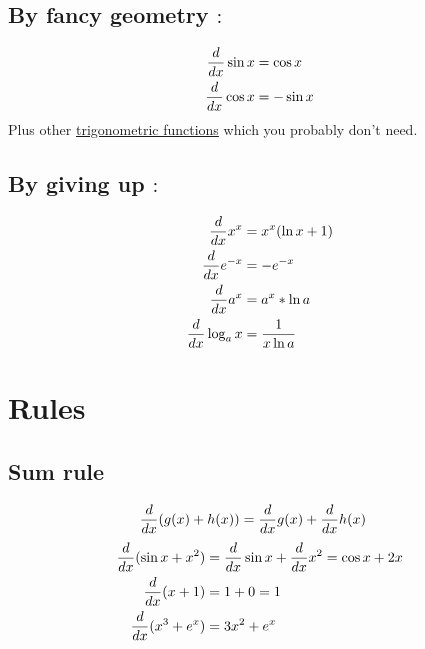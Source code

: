 \documentclass[a4paper,14pt,twoside]{book}
\begin{document}
{\subsection{By fancy geometry $:$}
\begin{align*}
	\frac{d}{dx} \sin{x} & = \cos{x}  \\
	\frac{d}{dx} \cos{x} & = -\sin{x}
\end{align*}
Plus other \href{https://www.priklady.eu/cs/matematika/derivace/derivace-funkce.alej}{trigonometric functions} which you probably don't need.
\subsection{By giving up $:$}
\begin{align*}
	\frac{d}{dx} x^x       & = x^x(\ln{x} + 1) \\
	\frac{d}{dx} e^{-x}    & = -e^{-x}         \\
	\frac{d}{dx} a^x       & = a^x*\ln{a}      \\
	\frac{d}{dx} \log_a{x} & = \frac{1}{x\ln{a}}
\end{align*}
\pagebreak
\section{Rules}
\subsection{Sum rule}
\begin{align*}
	\frac{d}{dx} (g(x) + h(x)) & = \frac{d}{dx} g(x) + \frac{d}{dx} h(x)
\end{align*}
\begin{align*}
	\frac{d}{dx} (\sin{x} + x^2) & = \frac{d}{dx} \sin{x} + \frac{d}{dx} x^2 = \cos{x} + 2x \\
	\frac{d}{dx} (x + 1)         & = 1 + 0 = 1                          \\
	\frac{d}{dx} (x^3 + e^x)     & = 3x^2 + e^x
\end{align*}
\pagebreak
}
\end{document}
